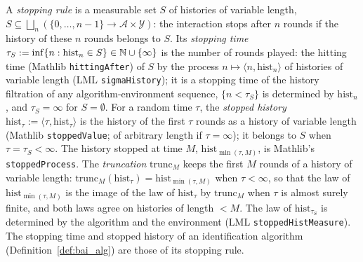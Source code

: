 \begin{definition}\label{def:stopping_rule}
\leanok
{}
A \emph{stopping rule} is a measurable set $S$ of histories of variable length,
$S \subseteq \bigsqcup_n (\{0,\dots,n-1\}\to\mathcal{A}\times\mathcal{Y})$: the interaction stops after
$n$ rounds if the history of these $n$ rounds belongs to $S$. Its \emph{stopping time}
$\tau_S := \inf\{n : \mathrm{hist}_n \in S\} \in \mathbb{N}\cup\{\infty\}$ is the number of rounds
played: the hitting time (Mathlib \texttt{hittingAfter}) of $S$ by the process
$n \mapsto \langle n, \mathrm{hist}_n\rangle$ of histories of variable length (LML
\texttt{sigmaHistory}); it is a stopping time of the history filtration of any
algorithm-environment sequence, $\{n < \tau_S\}$ is determined by $\mathrm{hist}_n$, and
$\tau_S = \infty$ for $S = \emptyset$. For a random time $\tau$, the \emph{stopped history}
$\mathrm{hist}_\tau := \langle\tau, \mathrm{hist}_\tau\rangle$ is the history of the first $\tau$
rounds as a history of variable length (Mathlib \texttt{stoppedValue}; of arbitrary length if
$\tau = \infty$); it belongs to $S$ when $\tau = \tau_S < \infty$. The history stopped at time
$M$, $\mathrm{hist}_{\min(\tau,M)}$, is Mathlib's \texttt{stoppedProcess}. The \emph{truncation}
$\mathrm{trunc}_M$ keeps the first $M$ rounds of a history of variable length:
$\mathrm{trunc}_M(\mathrm{hist}_\tau) = \mathrm{hist}_{\min(\tau,M)}$ when $\tau < \infty$, so
that the law of $\mathrm{hist}_{\min(\tau,M)}$ is the image of the law of $\mathrm{hist}_\tau$ by
$\mathrm{trunc}_M$ when $\tau$ is almost surely finite, and both laws agree on histories of
length $< M$. The law of $\mathrm{hist}_{\tau_S}$ is determined by the algorithm and the
environment (LML \texttt{stoppedHistMeasure}). The stopping time and stopped history of an
identification algorithm (Definition~\ref{def:bai_alg}) are those of its stopping rule.
\end{definition}

